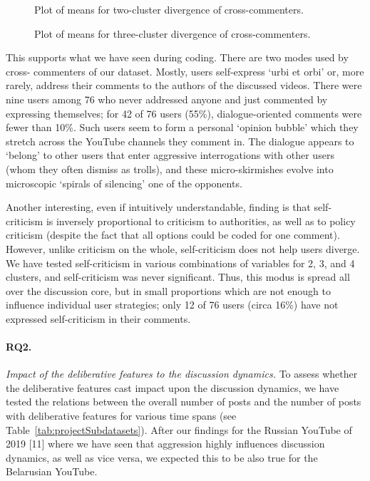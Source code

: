 \begin{figure}[ht]
	\caption{Plot of means for two-cluster divergence of cross-commenters.}\label{fig:twoClusterDivergence}
\end{figure} 

\begin{figure}[ht]
	\caption{Plot of means for three-cluster divergence of cross-commenters.}\label{fig:threeClusterDivergence}
\end{figure} 

This supports what we have seen during coding. There are two modes used by cross- commenters of our dataset. Mostly, users self-express ‘urbi et orbi’ or, more rarely, address their comments to the authors of the discussed videos. There were nine users among 76 who never addressed anyone and just commented by expressing themselves; for 42 of 76 users (55\%), dialogue-oriented comments were fewer than 10\%. Such users seem to form a personal ‘opinion bubble’ which they stretch across the YouTube channels they comment in. The dialogue appears to ‘belong’ to other users that enter aggressive interrogations with other users (whom they often dismiss as trolls), and these micro-skirmishes evolve into microscopic ‘spirals of silencing’ one of the opponents.

Another interesting, even if intuitively understandable, finding is that self-criticism is inversely proportional to criticism to authorities, as well as to policy criticism (despite the fact that all options could be coded for one comment). However, unlike criticism on the whole, self-criticism does not help users diverge. We have tested self-criticism in various combinations of variables for 2, 3, and 4 clusters, and self-criticism was never significant. Thus, this modus is spread all over the discussion core, but in small proportions which are not enough to influence individual user strategies; only 12 of 76 users (circa 16\%) have not expressed self-criticism in their comments.

\paragraph{RQ2.} \textit{Impact of the deliberative features to the discussion dynamics.} To assess whether the deliberative features cast impact upon the discussion dynamics, we have tested the relations between the overall number of posts and the number of posts with deliberative features for various time spans (see Table~\cref{tab:projectSubdatasets}). After our findings for the Russian YouTube of 2019 [11] where we have seen that aggression highly influences discussion dynamics, as well as vice versa, we expected this to be also true for the Belarusian YouTube.

